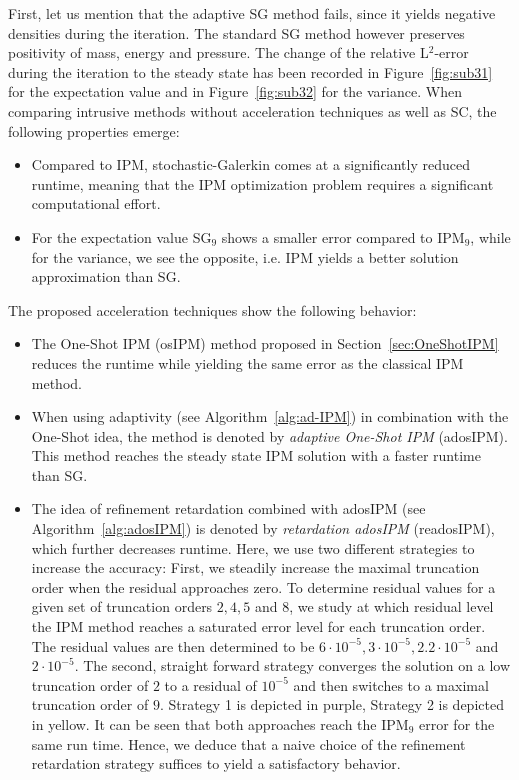 First, let us mention that the adaptive SG method fails, since it yields negative densities during the iteration. The standard SG method however preserves positivity of mass, energy and pressure. The change of the relative L$^2$-error during the iteration to the steady state has been recorded in Figure~\ref{fig:sub31} for the expectation value and in Figure~\ref{fig:sub32} for the variance. When comparing intrusive methods without acceleration techniques as well as SC, the following properties emerge:
\begin{itemize}
\item Compared to IPM, stochastic-Galerkin comes at a significantly reduced runtime, meaning that the IPM optimization problem requires a significant computational effort.
\item For the expectation value SG$_9$ shows a smaller error compared to IPM$_9$, while for the variance, we see the opposite, i.e. IPM yields a better solution approximation than SG.
\end{itemize}
The proposed acceleration techniques show the following behavior:
\begin{itemize}
\item The One-Shot IPM (osIPM) method proposed in Section~\ref{sec:OneShotIPM} reduces the runtime while yielding the same error as the classical IPM method.
\item When using adaptivity (see Algorithm~\ref{alg:ad-IPM}) in combination with the One-Shot idea, the method is denoted by \textit{adaptive One-Shot IPM} (adosIPM). This method reaches the steady state IPM solution with a faster runtime than SG.
\item The idea of refinement retardation combined with adosIPM (see Algorithm~\ref{alg:adosIPM}) is denoted by \textit{retardation adosIPM} (readosIPM), which further decreases runtime. Here, we use two different strategies to increase the accuracy: First, we steadily increase the maximal truncation order when the residual approaches zero. To determine residual values for a given set of truncation orders $2,4,5$ and $8$, we study at which residual level the IPM method reaches a saturated error level for each truncation order. The residual values are then determined to be $6\cdot 10^{-5},3\cdot 10^{-5},2.2\cdot 10^{-5}$ and $2\cdot 10^{-5}$. The second, straight forward strategy converges the solution on a low truncation order of $2$ to a residual of $10^{-5}$ and then switches to a maximal truncation order of $9$. Strategy 1 is depicted in purple, Strategy 2 is depicted in yellow. It can be seen that both approaches reach the IPM$_9$ error for the same run time. Hence, we deduce that a naive choice of the refinement retardation strategy suffices to yield a satisfactory behavior.
\end{itemize}

